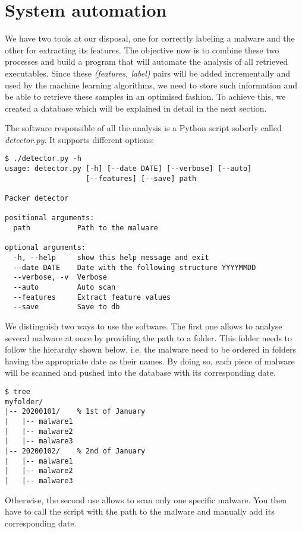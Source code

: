 \section{System automation}
We have two tools at our disposal, one for correctly labeling a malware and the other for extracting its features. The objective now is to combine these two processes and build a program that will automate the analysis of all retrieved executables. Since these \textit{(features, label)} pairs will be added incrementally and used by the machine learning algorithms, we need to store such information and be able to retrieve these samples in an optimised fashion. To achieve this, we created a database which will be explained in detail in the next section.

The software responsible of all the analysis is a Python script soberly called \textit{detector.py}. It supports different options:

\begin{lstlisting}
$ ./detector.py -h
usage: detector.py [-h] [--date DATE] [--verbose] [--auto]
                   [--features] [--save] path

Packer detector

positional arguments:
  path           Path to the malware

optional arguments:
  -h, --help     show this help message and exit
  --date DATE    Date with the following structure YYYYMMDD
  --verbose, -v  Verbose
  --auto         Auto scan
  --features     Extract feature values
  --save         Save to db
\end{lstlisting}

We distinguish two ways to use the software. The first one allows to analyse several malware at once by providing the path to a folder. This folder needs to follow the hierarchy shown below, i.e. the malware need to be ordered in folders having the appropriate date as their names. By doing so, each piece of malware will be scanned and pushed into the database with its corresponding date.

\begin{lstlisting}
$ tree
myfolder/
|-- 20200101/    % 1st of January
|   |-- malware1
|   |-- malware2
|   |-- malware3
|-- 20200102/    % 2nd of January
|   |-- malware1
|   |-- malware2
|   |-- malware3
\end{lstlisting}
Otherwise, the second use allows to scan only one specific malware. You then have to call the script with the path to the malware and manually add its corresponding date.

